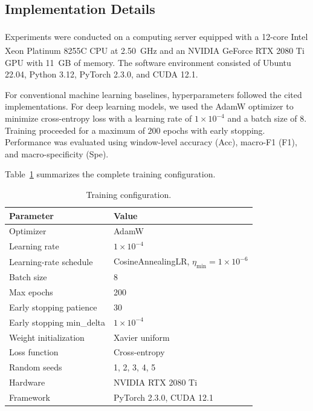 ﻿\documentclass[12pt]{article}
\begin{document}
\subsection{Implementation Details}
Experiments were conducted on a computing server equipped with a 12-core Intel\textsuperscript{\textregistered} Xeon\textsuperscript{\textregistered} Platinum 8255C CPU at 2.50~GHz and an NVIDIA GeForce RTX 2080 Ti GPU with 11~GB of memory. The software environment consisted of Ubuntu 22.04, Python 3.12, PyTorch 2.3.0, and CUDA 12.1.

For conventional machine learning baselines, hyperparameters followed the cited implementations. For deep learning models, we used the AdamW optimizer \cite{ref64} to minimize cross-entropy loss with a learning rate of $1\times10^{-4}$ and a batch size of $8$. Training proceeded for a maximum of $200$ epochs with early stopping. Performance was evaluated using window-level accuracy (Acc), macro-F1 (F1), and macro-specificity (Spe).

Table~\ref{tab:training_config} summarizes the complete training configuration.

\begin{table}[h]
\centering
\caption{Training configuration.}
\label{tab:training_config}
\footnotesize
\renewcommand{\arraystretch}{1.2}
\setlength{\tabcolsep}{4pt}
\begin{tabular}{@{}ll@{}}
\toprule
Parameter & Value \\
\midrule
Optimizer & AdamW \\
Learning rate & $1 \times 10^{-4}$ \\
Learning-rate schedule & CosineAnnealingLR, $\eta_{\min} = 1 \times 10^{-6}$ \\
Batch size & 8 \\
Max epochs & 200 \\
Early stopping patience & 30 \\
Early stopping min\_delta & $1 \times 10^{-4}$ \\
Weight initialization & Xavier uniform \\
Loss function & Cross-entropy \\
Random seeds & 1, 2, 3, 4, 5 \\
Hardware & NVIDIA RTX 2080 Ti \\
Framework & PyTorch 2.3.0, CUDA 12.1 \\
\bottomrule
\end{tabular}
\end{table}
\end{document}
